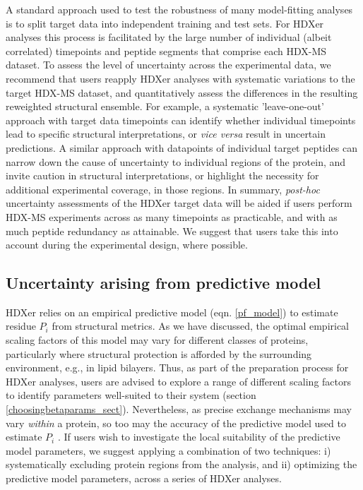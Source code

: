 \documentclass[9pt,tutorial]{livecoms}
\begin{document}
A standard approach used to test the robustness of many model-fitting analyses is to split target data into independent training and test sets.
For HDXer analyses this process is facilitated by the large number of individual (albeit correlated) timepoints and peptide segments that comprise each HDX-MS dataset.
To assess the level of uncertainty across the experimental data, we recommend that users reapply HDXer analyses with systematic variations to the target HDX-MS dataset, and quantitatively assess the differences in the resulting reweighted structural ensemble. 
For example, a systematic 'leave-one-out' approach with target data timepoints can identify whether individual timepoints lead to specific structural interpretations, or \textit{vice versa} result in uncertain predictions.
A similar approach with datapoints of individual target peptides can narrow down the cause of uncertainty to individual regions of the protein, and invite caution in structural interpretations, or highlight the necessity for additional experimental coverage, in those regions.
In summary, \textit{post-hoc} uncertainty assessments of the HDXer target data will be aided if users perform HDX-MS experiments across as many timepoints as practicable, and with as much peptide redundancy as attainable.
We suggest that users take this into account during the experimental design, where possible.

\subsection{Uncertainty arising from predictive model}
HDXer relies on an empirical predictive model (eqn. \ref{pf_model}) to estimate residue $P_i$ from structural metrics.
As we have discussed, the optimal empirical scaling factors of this model may vary for different classes of proteins, particularly where structural protection is afforded by the surrounding environment, e.g., in lipid bilayers.
Thus, as part of the preparation process for HDXer analyses, users are advised to explore a range of different scaling factors to identify parameters well-suited to their system (section \ref{choosingbetaparams_sect}).
Nevertheless, as precise exchange mechanisms may vary \textit{within} a protein, so too may the accuracy of the predictive model used to estimate $P_i$ \cite{Skinner2012models, Mohammadiarani2018, McAllister2015}.
If users wish to investigate the local suitability of the predictive model parameters, we suggest applying a combination of two techniques: i) systematically excluding protein regions from the analysis, and ii) optimizing the predictive model parameters, across a series of HDXer analyses. 
\end{document}
